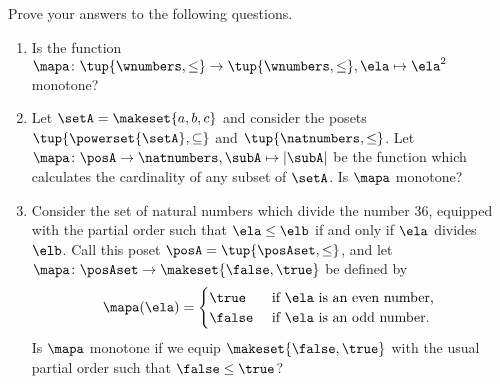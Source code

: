 \begin{gradedexercise}
    \label{ex:MonotoneMap?}

    Prove your answers to the following questions.
    \begin{enumerate}
        \item Is the function $\mapa \colon \tup{\wnumbers, \leq} \to \tup{\wnumbers, \leq}, \ela \mapsto \ela^2$ monotone?
        \item Let $\setA = \makeset{a, b, c}$ and consider the posets $\tup{\powerset{\setA}, \subseteq}$ and $\tup{\natnumbers, \leq}$.
              Let $\mapa \colon \posA \to \natnumbers, \subA \mapsto \vert \subA \vert$ be the function which calculates the cardinality of any subset of $\setA$.
              Is $\mapa$ monotone?
        \item Consider the set of natural numbers which divide the number 36, equipped with the partial order such that $\ela \leq \elb$ if and only if $\ela$ divides $\elb$.
              Call this poset $\posA = \tup{\posAset, \leq}$, and let $\mapa \colon \posAset \to \makeset{\false, \true}$ be defined by
              \begin{equation}
                  \mapa(\ela) =
                  \begin{cases}
                      \true  & \text{ if } \ela \text{ is an even number, } \\
                      \false & \text{ if } \ela \text{ is an odd number.
                      }
                  \end{cases}
              \end{equation}
              Is $\mapa$ monotone if we equip $\makeset{\false, \true}$ with the usual partial order such that $\false \leq \true$?
    \end{enumerate}
\end{gradedexercise}

